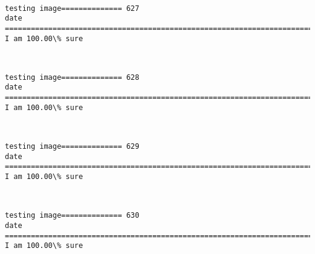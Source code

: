 \documentclass[11pt]{article}
\begin{document}
    \begin{center}
    \end{center}
    { \hspace*{\fill} \\}
    
    \begin{Verbatim}[commandchars=\\\{\}]
testing image============== 627
date
============================================================================
I am 100.00\% sure

    \end{Verbatim}

    \begin{center}
    \end{center}
    { \hspace*{\fill} \\}
    
    \begin{Verbatim}[commandchars=\\\{\}]
testing image============== 628
date
============================================================================
I am 100.00\% sure

    \end{Verbatim}

    \begin{center}
    \end{center}
    { \hspace*{\fill} \\}
    
    \begin{Verbatim}[commandchars=\\\{\}]
testing image============== 629
date
============================================================================
I am 100.00\% sure

    \end{Verbatim}

    \begin{center}
    \end{center}
    { \hspace*{\fill} \\}
    
    \begin{Verbatim}[commandchars=\\\{\}]
testing image============== 630
date
============================================================================
I am 100.00\% sure

    \end{Verbatim}
\end{document}
